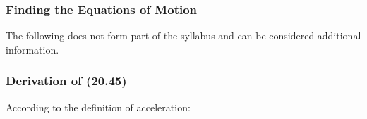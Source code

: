       \label{m38796*uid134}
            \subsubsection{ Finding the Equations of Motion}
            \nopagebreak
            
        
        \label{m38796*id76225}The following does not form part of the syllabus and can be considered additional information.\par 
        \label{m38796*uid135}
            \subsubsection{ Derivation of (20.45)}
            \nopagebreak
            
          
          \label{m38796*id76242}According to the definition of acceleration:\par 
          \label{m38796*id76246}\nopagebreak\noindent{}
    
